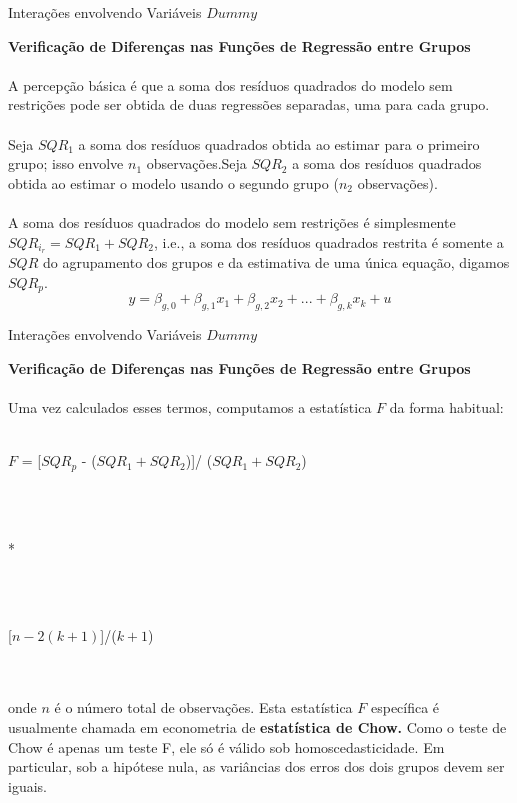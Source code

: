 \documentclass[t,14pt,mathserif]{beamer}
\begin{document}
{
\begin{frame}{Interações envolvendo Variáveis $Dummy$}
		\begin{tcolorbox}
			\indent\textbf{\small{Verificação de Diferenças nas Funções de Regressão entre Grupos}}\\ 
			\\ \footnotesize{A percepção básica é que a soma dos resíduos quadrados do modelo sem restrições pode ser obtida de duas regressões separadas, uma para cada grupo.}\\
			 \\ \footnotesize{Seja $SQR_1$ a soma dos resíduos quadrados obtida ao estimar para o primeiro grupo; isso envolve $n_1$ observações.Seja $SQR_2$ a soma dos resíduos quadrados obtida ao estimar o modelo usando o segundo grupo ($n_2$ observações)}.\\
			 \\ \footnotesize{A soma dos resíduos quadrados do modelo sem restrições é simplesmente $SQR_i_r = SQR_1 + SQR_2$, i.e., a soma dos resíduos quadrados restrita é somente a $SQR$ do agrupamento dos grupos e da estimativa de uma única equação, digamos $SQR_p$}.
			 \begin{equation}
			y = \beta_{g,0} + \beta_{g,1}x_1 + \beta_{g,2}x_2 + ... + \beta_{g,k}x_k + u \label{eq1}\nonumber
			\end{equation}
		\end{tcolorbox}
       
\end{frame}
}  
{
\begin{frame}{Interações envolvendo Variáveis $Dummy$}
		\begin{tcolorbox}
			\indent\textbf{\small{Verificação de Diferenças nas Funções de Regressão entre Grupos}}\\ 
			\\ \footnotesize{Uma vez calculados esses termos, computamos a estatística $F$ da forma habitual:}\\
			 \small
			 \\ \centerline{$F$ = {[$SQR_p$ - ($SQR_1 + SQR_2$)]/ ($SQR_1 + SQR_2$)}}\\
			\\ \centerline{*} \\
			 \\ \centerline{ [$n - 2(k + 1)$]/($k + 1$)}\\ 
		\\ \footnotesize{onde $n$ é o número total de observações. Esta estatística $F$ específica é usualmente chamada em econometria de  \textbf{estatística de Chow.} Como o teste de Chow é apenas um teste F, ele só é válido sob homoscedasticidade. Em particular, sob a hipótese nula, as variâncias dos erros dos dois grupos devem ser iguais}.
	
		\end{tcolorbox}
       
\end{frame}
}  
\end{document}
